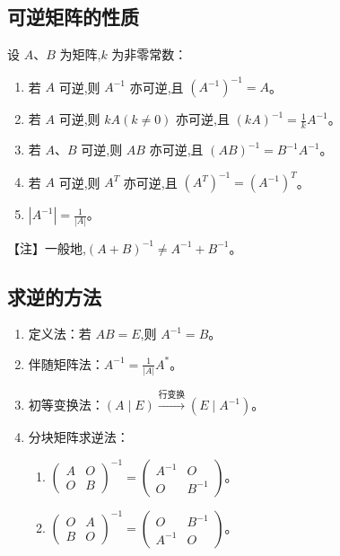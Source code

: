 \documentclass[UTF8]{ctexart}
\theoremstyle{remark}
\begin{document}
	\subsection{可逆矩阵的性质}
	设 \(A\)、\(B\) 为矩阵,\(k\) 为非零常数：
	\begin{enumerate}
		\item 若 \(A\) 可逆,则 \(A^{-1}\) 亦可逆,且 \((A^{-1})^{-1} = A\)。
		\item 若 \(A\) 可逆,则 \(kA (k\neq 0)\) 亦可逆,且 \((kA)^{-1} = \frac{1}{k}A^{-1}\)。
		\item 若 \(A\)、\(B\) 可逆,则 \(AB\) 亦可逆,且 \((AB)^{-1} = B^{-1}A^{-1}\)。
		\item 若 \(A\) 可逆,则 \(A^T\) 亦可逆,且 \((A^T)^{-1} = (A^{-1})^T\)。
		\item \(|A^{-1}| = \frac{1}{|A|}\)。
	\end{enumerate}
	【注】一般地,\((A + B)^{-1} \neq A^{-1} + B^{-1}\)。
	
	\subsection{求逆的方法}
	\begin{enumerate}
		\item 定义法：若 \(AB = E\),则 \(A^{-1} = B\)。
		\item 伴随矩阵法：\(A^{-1} = \frac{1}{|A|}A^*\)。
		\item 初等变换法：\((A \mid E) \xrightarrow{\text{行变换}} (E \mid A^{-1})\)。
		\item 分块矩阵求逆法：
		\begin{enumerate}
			\item \(\begin{pmatrix}
				A & O \\
				O & B
			\end{pmatrix}^{-1} = 
			\begin{pmatrix}
				A^{-1} & O \\
				O & B^{-1}
			\end{pmatrix}\)。
			\item \(\begin{pmatrix}
				O & A \\
				B & O
			\end{pmatrix}^{-1} = 
			\begin{pmatrix}
				O & B^{-1} \\
				A^{-1} & O
			\end{pmatrix}\)。
		\end{enumerate}
	\end{enumerate}
	
\end{document}
